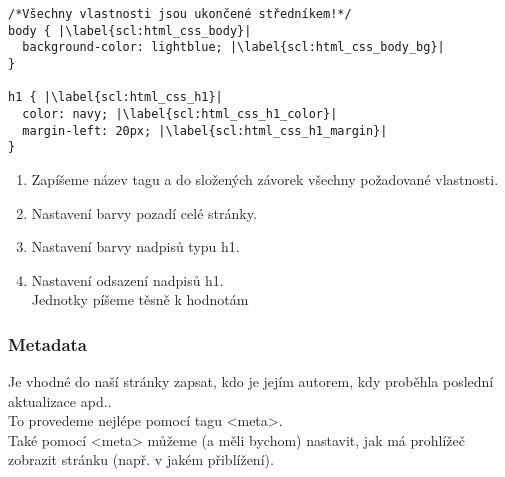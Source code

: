 \begin{minipage}[t]{.45\textwidth}
\begin{code}
\begin{verbatim}
/*Všechny vlastnosti jsou ukončené středníkem!*/
body { |\label{scl:html_css_body}|
  background-color: lightblue; |\label{scl:html_css_body_bg}|
}

h1 { |\label{scl:html_css_h1}|
  color: navy; |\label{scl:html_css_h1_color}|
  margin-left: 20px; |\label{scl:html_css_h1_margin}|
}
\end{verbatim}

\label{code:css_uvod}
\end{code}
\end{minipage}
\begin{minipage}[t]{.45\textwidth}
\begin{enumerate}
\vspace{0.4cm}
\item[ř. \ref{scl:html_css_body}. \ref{scl:html_css_h1}:] Zapíšeme název tagu a do složených závorek všechny požadované vlastnosti.
\item[ř. \ref{scl:html_css_body_bg}:] Nastavení barvy pozadí celé stránky.
\item[ř. \ref{scl:html_css_h1_color}:] Nastavení barvy nadpisů typu h1.
\item[ř. \ref{scl:html_css_h1_margin}:] Nastavení odsazení nadpisů h1.\\Jednotky píšeme těsně k hodnotám
\end{enumerate}
\end{minipage}

\subsubsection{Metadata}
Je vhodné do naší stránky zapsat, kdo je jejím autorem, kdy proběhla poslední aktualizace apd..\\
To provedeme nejlépe pomocí tagu <meta>.\\
Také pomocí <meta> můžeme (a měli bychom) nastavit, jak má prohlížeč zobrazit stránku (např. v jakém přiblížení).\\

